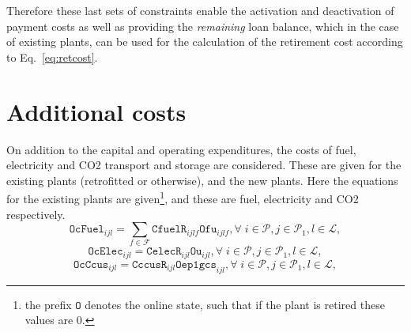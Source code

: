 \documentclass{amsbook}
\begin{document}
Therefore these last sets of constraints enable the activation and deactivation
of payment costs as well as providing the \emph{remaining} loan balance, which
in the case of existing plants, can be used for the calculation of the
retirement cost according to Eq.~\eqref{eq:retcost}.
%
\section{Additional costs}
%
%
On addition to the capital and operating expenditures, the costs of fuel,
electricity and CO2 transport and storage are considered. These are given for
the existing plants (retrofitted or otherwise), and the new plants.
Here the equations for the existing plants are given\footnote{the prefix
$\mathtt{O}$ denotes the online state, such that if the plant is retired these
values are 0.}, and these are fuel, electricity and CO2 respectively.
%
\begin{equation}
    \mathtt{OcFuel}_{ijl} = \sum_{f \in \mathcal{F}} 
    \mathtt{CfuelR}_{ijlf} \mathtt{Ofu}_{ijlf},
    \forall \; i \in \mathcal{P},j \in \mathcal{P}_1 ,
    l \in \mathcal{L},
\end{equation}
%
\begin{equation}
    \mathtt{OcElec}_{ijl} = \mathtt{CelecR}_{ijl} \mathtt{Ou}_{ijl},
    \forall \; i \in \mathcal{P},j \in \mathcal{P}_1 , l \in \mathcal{L},
\end{equation}
%
\begin{equation}
    \mathtt{OcCcus}_{ijl} = \mathtt{CccusR}_{ijl} \mathtt{Oep1gcs}_{ijl},
    \forall \; i \in \mathcal{P},j \in \mathcal{P}_1 , l \in \mathcal{L},
\end{equation}
%
\end{document}
